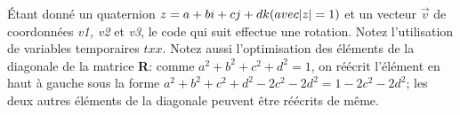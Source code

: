 Étant donné un quaternion $z = a + bi + cj + dk (avec \lvert z\rvert = 1)$ et un vecteur
$\vec{v}$ de coordonnées \emph{v1, v2} et \emph{v3}, le code qui suit 
effectue une rotation. Notez l'utilisation de variables temporaires 
$txx$. Notez aussi l'optimisation des éléments de la diagonale de la matrice
\textbf{R}: comme $a^2 + b^2 + c^2 + d^2 = 1$, on réécrit l'élément en 
haut à gauche sous la forme $a^2 + b^2 + c^2 + d^2 -2c^2 - 2d^2 = 1 - 2c^2 - 2d^2$;
les deux autres éléments de la diagonale peuvent être réécrits de même.




\clearpage